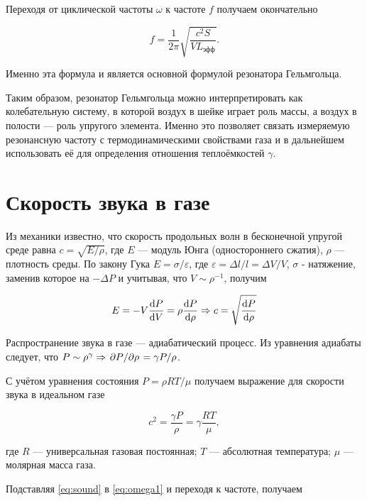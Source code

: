 \documentclass[12pt]{extreport}
\begin{document}
	Переходя от циклической частоты \(\omega\) к частоте \(f\) получаем окончательно
	
	
	\begin{equation}
		\boxed{f=\frac{1}{2\pi}\sqrt{\frac{c^2S}{V L_{\text{эфф}}}}.}
		\label{eq:helmholtz}
	\end{equation}
	
	Именно эта формула и является основной формулой резонатора Гельмгольца. 
	
	Таким образом, резонатор Гельмгольца можно интерпретировать как колебательную систему, в которой воздух в шейке играет роль массы, а воздух в полости --- роль упругого элемента. Именно это позволяет связать измеряемую резонансную частоту с термодинамическими свойствами газа и в дальнейшем использовать её для определения отношения теплоёмкостей \(\gamma\).
	
	\section{Скорость звука в газе}
	
	\hspace{4mm} Из механики известно, что скорость продольных волн в бесконечной упругой среде равна $c = \sqrt{E/\rho}$, где $E$ --- модуль Юнга (одностороннего сжатия), $\rho$ --- плотность среды. По закону Гука $E = \sigma / \varepsilon$, где $\varepsilon = \Delta l / l = \Delta V / V$, $\sigma$ - натяжение, заменив которое на $-\Delta P$ и учитывая, что $V \sim \rho^{-1}$, получим 
	
	\begin{equation*}
		E = -V \odv{P}{V} = \rho \odv{P}{\rho} \Rightarrow c = \sqrt{\odv{P}{\rho}}
	\end{equation*}
	
	Распространение звука в газе --- адиабатический процесс. Из уравнения адиабаты следует, что $P \sim \rho^\gamma \Rightarrow \pdv{P}/{\rho} = \gamma P/\rho$.
	
	С учётом уравнения состояния $P = \rho R T / \mu$ получаем выражение для скорости звука в идеальном газе
	
	\begin{equation}
		c^2= \frac{\gamma P}{\rho} =\gamma \frac{RT}{\mu},
		\label{eq:sound}
	\end{equation}
	
	где \(R\) --- универсальная газовая постоянная; \(T\) --- абсолютная температура; \(\mu\) --- молярная масса газа.
	
	
	Подставляя \eqref{eq:sound} в \eqref{eq:omega1} и переходя к частоте, получаем
\end{document}
